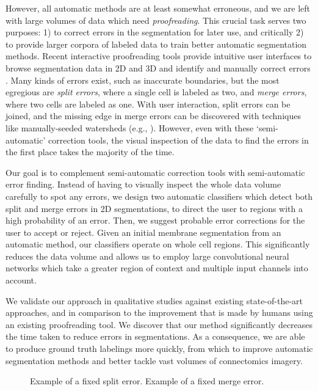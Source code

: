 However, all automatic methods are at least somewhat erroneous, and we are left with large volumes of data which need \emph{proofreading}. This crucial task serves two purposes: 1) to correct errors in the segmentation for later use, and critically 2) to provide larger corpora of labeled data to train better automatic segmentation methods. Recent interactive proofreading tools provide intuitive user interfaces to browse segmentation data in 2D and 3D and identify and manually correct errors \cite{raveler,mojo2,haehn_dojo_2014}. Many kinds of errors exist, such as inaccurate boundaries, but the most egregious are \emph{split errors}, where a single cell is labeled as two, and \emph{merge errors}, where two cells are labeled as one. With user interaction, split errors can be joined, and the missing edge in merge errors can be discovered with techniques like manually-seeded watersheds (e.g., \cite{haehn_dojo_2014}). However, even with these `semi-automatic' correction tools, the visual inspection of the data to find the errors in the first place takes the majority of the time.

Our goal is to complement semi-automatic correction tools with semi-automatic error finding. Instead of having to visually inspect the whole data volume carefully to spot any errors, we design two automatic classifiers which detect both split and merge errors in 2D segmentations, to direct the user to regions with a high probability of an error. Then, we suggest probable error corrections for the user to accept or reject. Given an initial membrane segmentation from an automatic method, our classifiers operate on whole cell regions. This significantly reduces the data volume and allows us to employ large convolutional neural networks which take a greater region of context and multiple input channels into account.

We validate our approach in qualitative studies against existing state-of-the-art approaches, and in comparison to the improvement that is made by humans using an existing proofreading tool. We discover that our method significantly decreases the time taken to reduce errors in segmentations. As a consequence, we are able to produce ground truth labelings more quickly, from which to improve automatic segmentation methods and better tackle vast volumes of connectomics imagery.

\begin{figure}
\caption{Example of a fixed split error. Example of a fixed merge error.}
\end{figure}